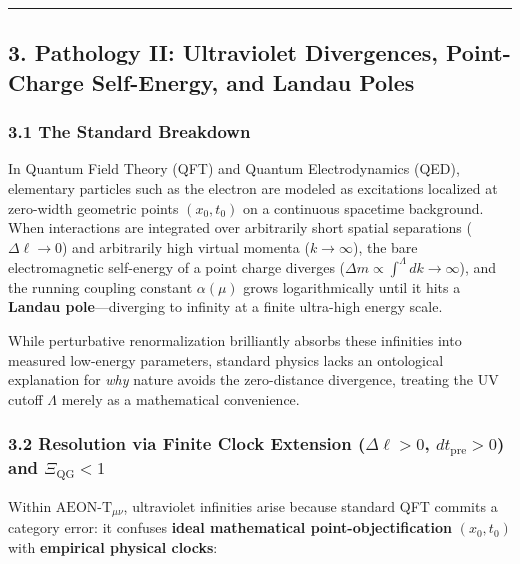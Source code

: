 \documentclass[
]{article}
\begin{document}
\begin{center}\rule{0.5\linewidth}{0.5pt}\end{center}

\subsection{3. Pathology II: Ultraviolet Divergences, Point-Charge
Self-Energy, and Landau
Poles}\label{pathology-ii-ultraviolet-divergences-point-charge-self-energy-and-landau-poles}

\subsubsection{3.1 The Standard
Breakdown}\label{the-standard-breakdown-1}

In Quantum Field Theory (QFT) and Quantum Electrodynamics (QED),
elementary particles such as the electron are modeled as excitations
localized at zero-width geometric points \((x_0, t_0)\) on a continuous
spacetime background. When interactions are integrated over arbitrarily
short spatial separations (\(\Delta\ell \to 0\)) and arbitrarily high
virtual momenta (\(k \to \infty\)), the bare electromagnetic self-energy
of a point charge diverges
(\(\Delta m \propto \int^{\Lambda} dk \to \infty\)), and the running
coupling constant \(\alpha(\mu)\) grows logarithmically until it hits a
\textbf{Landau pole}---diverging to infinity at a finite ultra-high
energy scale.

While perturbative renormalization brilliantly absorbs these infinities
into measured low-energy parameters, standard physics lacks an
ontological explanation for \emph{why} nature avoids the zero-distance
divergence, treating the UV cutoff \(\Lambda\) merely as a mathematical
convenience.

\subsubsection{\texorpdfstring{3.2 Resolution via Finite Clock Extension
(\(\Delta\ell > 0\), \(dt_{\mathrm{pre}} > 0\)) and
\(\Xi_{\mathrm{QG}} < 1\)}{3.2 Resolution via Finite Clock Extension (\textbackslash Delta\textbackslash ell \textgreater{} 0, dt\_\{\textbackslash mathrm\{pre\}\} \textgreater{} 0) and \textbackslash Xi\_\{\textbackslash mathrm\{QG\}\} \textless{} 1}}\label{resolution-via-finite-clock-extension-deltaell-0-dt_mathrmpre-0-and-xi_mathrmqg-1}

Within \(\text{AEON-T}_{\mu\nu}\), ultraviolet infinities arise because
standard QFT commits a category error: it confuses \textbf{ideal
mathematical point-objectification} \((x_0, t_0)\) with
\textbf{empirical physical clocks}:
\end{document}
